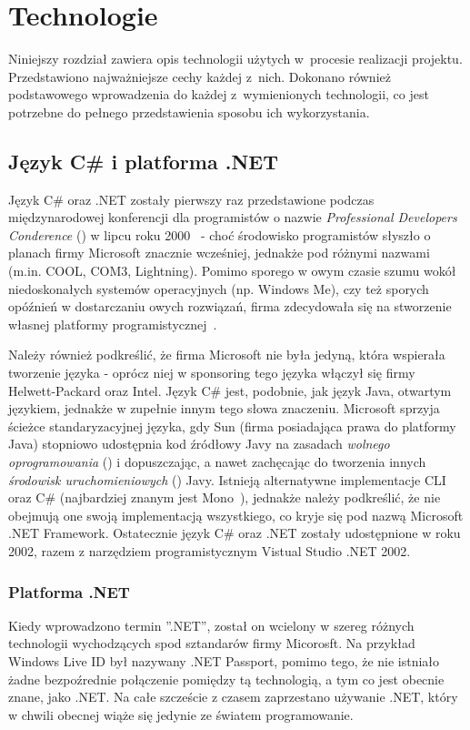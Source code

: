 \chapter{Technologie}\label{chap:technologie}

Niniejszy rozdział zawiera opis technologii użytych w~procesie realizacji projektu. Przedstawiono najważniejsze cechy każdej z~nich. Dokonano również podstawowego wprowadzenia do każdej z~wymienionych technologii, co jest potrzebne do pełnego przedstawienia sposobu ich wykorzystania.

\section{Język C\# i platforma .NET}\label{sec:cs}
Język C\# oraz .NET zostały pierwszy raz przedstawione podczas międzynarodowej konferencji dla programistów o nazwie \emph{Professional Developers Conderence} () w lipcu roku 2000~\cite{ms:initDotNet} - choć środowisko programistów słyszło o planach firmy Microsoft znacznie wcześniej, jednakże pod różnymi nazwami (m.in. COOL, COM3, Lightning). Pomimo sporego w owym czasie szumu wokół niedoskonałych systemów operacyjnych (np. Windows Me), czy też sporych opóźnień w dostarczaniu owych rozwiązań, firma zdecydowała się na stworzenie własnej platformy programistycznej~\cite{cSharp:inDepthF}.

Należy również podkreślić, że firma Microsoft nie była jedyną, która wspierała tworzenie języka - oprócz niej w sponsoring tego języka włączył się firmy Helwett-Packard oraz Intel. Język C\# jest, podobnie, jak język Java, otwartym językiem, jednakże w zupełnie innym tego słowa znaczeniu. Microsoft sprzyja ścieżce standaryzacyjnej języka, gdy Sun (firma posiadająca prawa do platformy Java) stopniowo udostępnia kod źródłowy Javy na zasadach \emph{wolnego oprogramowania} () i dopuszczając, a nawet zachęcając do tworzenia innych \emph{środowisk uruchomieniowych} () Javy. Istnieją alternatywne implementacje CLI oraz C\# (najbardziej znanym jest Mono~\cite{cs:mono}), jednakże należy podkreślić, że nie obejmują one swoją implementacją wszystkiego, co kryje się pod nazwą Microsoft .NET Framework. Ostatecznie język C\# oraz .NET zostały udostępnione w roku 2002, razem z narzędziem programistycznym Vistual Studio .NET 2002.

\subsection{Platforma .NET}
Kiedy wprowadzono termin ''.NET'', został on wcielony w szereg różnych technologii wychodzących spod sztandarów firmy Micorosft. Na przykład Windows Live ID był nazywany .NET Passport, pomimo tego, że nie istniało żadne bezpoźrednie połączenie pomiędzy tą technologią, a tym co jest obecnie znane, jako .NET. Na całe szczeście z czasem zaprzestano używanie .NET, który w chwili obecnej wiąże się jedynie ze światem programowanie.

